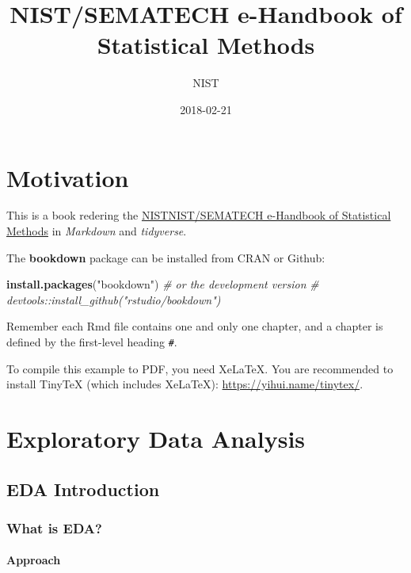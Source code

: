 \documentclass[]{book}
\title{NIST/SEMATECH e-Handbook of Statistical Methods}
\author{NIST}
\date{2018-02-21}
\newenvironment{Shaded}{\begin{snugshade}}{\end{snugshade}}
\newcommand{\KeywordTok}[1]{\textcolor[rgb]{0.13,0.29,0.53}{\textbf{#1}}}
\newcommand{\StringTok}[1]{\textcolor[rgb]{0.31,0.60,0.02}{#1}}
\newcommand{\CommentTok}[1]{\textcolor[rgb]{0.56,0.35,0.01}{\textit{#1}}}
\newcommand{\NormalTok}[1]{#1}
\theoremstyle{definition}
\theoremstyle{definition}
\theoremstyle{definition}
\theoremstyle{remark}
\begin{document}
\maketitle

{
\setcounter{tocdepth}{1}
\tableofcontents
}
\chapter*{Motivation}\label{motivation}

This is a book redering the
\href{http://www.itl.nist.gov/div898/handbook/}{NISTNIST/SEMATECH
e-Handbook of Statistical Methods} in \emph{Markdown} and
\emph{tidyverse}.

The \textbf{bookdown} package can be installed from CRAN or Github:

\begin{Shaded}
\begin{Highlighting}[]
\KeywordTok{install.packages}\NormalTok{(}\StringTok{"bookdown"}\NormalTok{)}
\CommentTok{# or the development version}
\CommentTok{# devtools::install_github("rstudio/bookdown")}
\end{Highlighting}
\end{Shaded}

Remember each Rmd file contains one and only one chapter, and a chapter
is defined by the first-level heading \texttt{\#}.

To compile this example to PDF, you need XeLaTeX. You are recommended to
install TinyTeX (which includes XeLaTeX):
\url{https://yihui.name/tinytex/}.

\chapter{Exploratory Data Analysis}\label{exploratory-data-analysis}

\section{EDA Introduction}\label{eda-introduction}

\subsection{What is EDA?}\label{what-is-eda}

\subsubsection{Approach}\label{approach}
\end{document}
